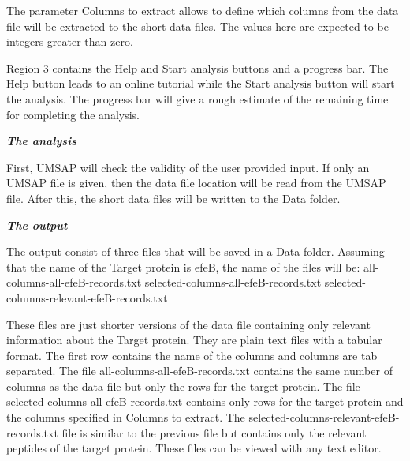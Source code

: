 The parameter Columns to extract allows to define which columns from the data file will be extracted to the short data files. The values here are expected to be integers greater than zero.

Region \num{3} contains the Help and Start analysis buttons and a progress bar. The Help button leads to an online tutorial while the Start analysis button will start the analysis. The progress bar will give a rough estimate of the remaining time for completing the analysis.

\textit{\textbf{The analysis}}

First, UMSAP will check the validity of the user provided input. If only an UMSAP file is given, then the data file location will be read from the UMSAP file. After this, the short data files will be written to the Data folder.

\textit{\textbf{The output}}

The output consist of three files that will be saved in a Data folder. Assuming that the name of the Target protein is efeB, the name of the files will be:\newline 
all-columns-all-efeB-records.txt \newline
selected-columns-all-efeB-records.txt \newline
selected-columns-relevant-efeB-records.txt

These files are just shorter versions of the data file containing only relevant information about the Target protein. They are plain text files with a tabular format. The first row contains the name of the columns and columns are tab separated. The file all-columns-all-efeB-records.txt contains the same number of columns as the data file but only the rows for the target protein. The file selected-columns-all-efeB-records.txt contains only rows for the target protein and the columns specified in Columns to extract. The selected-columns-relevant-efeB-records.txt file is similar to the previous file but contains only the relevant peptides of the target protein. These files can be viewed with any text editor.
